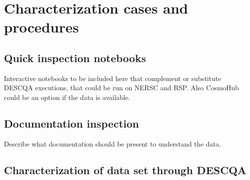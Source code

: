 \documentclass[11pt, a4paper]{article}
\begin{document}
\section{Characterization cases and procedures}

\subsection{Quick inspection notebooks}
Interactive notebooks to be included here that complement or substitute DESCQA executions, that could be run on NERSC and RSP. Also CosmoHub could be an option if the data is available.

\subsection{Documentation inspection}
Describe what documentation should be present to understand the data.

\subsection{Characterization of data set through DESCQA}









\end{document}
